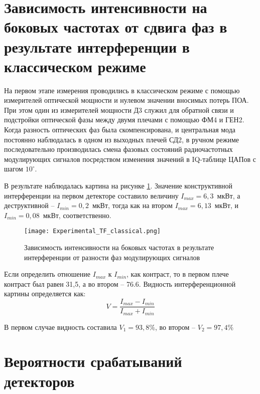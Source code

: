 
\section{Зависимость интенсивности на боковых частотах от сдвига фаз в результате интерференции в классическом режиме} \label{ch:ch5/sec5}


На первом этапе измерения проводились в классическом режиме с помощью измерителей оптической мощности и нулевом значении вносимых потерь ПОА. При этом один из измерителей мощности Д3 служил для обратной связи и подстройки оптической фазы между двумя плечами с помощью ФМ4 и ГЕН2. Когда разность оптических фаз была скомпенсирована, и центральная мода постоянно наблюдалась в одном из выходных плечей СД2, в ручном режиме последовательно производилась смена фазовых состояний радиочастотных модулирующих сигналов посредством изменения значений в IQ-таблице ЦАПов с шагом $10^{\circ}$. 

В результате наблюдалась картина на рисунке \ref{fig:Experimental_TF_classical}. Значение конструктивной интерференции на первом детекторе составило величину $I_{max}=6,3$~мкВт, а деструктивной -- $I_{min}=0,2$~мкВт, тогда как на втором $I_{max}=6,13$~мкВт, и $I_{min}=0,08$~мкВт, соответственно. 

 \begin{figure}[ht]
  \centering
  \texttt{[image: Experimental\_TF\_classical.png]}
  \caption{Зависимость интенсивности на боковых частотах в результате интерференции от разности фаз модулирующих сигналов}
  \label{fig:Experimental_TF_classical}
\end{figure}

Если определить отношение $I_{max}$ к $I_{min}$, как контраст, то в первом плече контраст был равен 31,5, а во втором -- 76.6. Видность интерференционной картины определяется как: 
\begin{equation}
	V=\frac{I_{max}-I_{min}}{I_{max}+I_{min}}
\end{equation}

В первом случае видность составила $V_{1}=93,8\%$, во втором -- $V_{2}=97,4\%$


\pagebreak


\section{Вероятности срабатываний детекторов} \label{ch:ch5/sec6}

